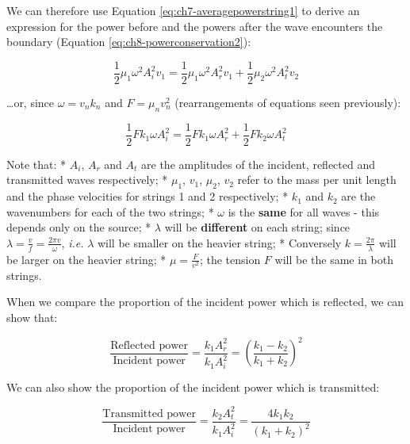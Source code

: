 \documentclass[
]{book}
\begin{document}
We can therefore use Equation \eqref{eq:ch7-averagepowerstring1} to derive an expression for the power before and the powers after the wave encounters the boundary (Equation \eqref{eq:ch8-powerconservation2}):

\begin{equation}
\frac{1}{2}\mu_1 \omega^2 A_i^2 v_1 = \frac{1}{2}\mu_1 \omega^2 A_r^2 v_1 + \frac{1}{2}\mu_2 \omega^2 A_t^2 v_2
\label{eq:ch8-powerconservation2}
\end{equation}

\ldots or, since \(\omega = v_n k_n\) and \(F = \mu_n v_n^2\) (rearrangements of equations seen previously):

\begin{equation}
\frac{1}{2} F k_1 \omega A_i^2  = \frac{1}{2}F k_1 \omega A_r^2 + \frac{1}{2}F k_2 \omega A_t^2
\label{eq:ch8-powerconservation3}
\end{equation}

Note that:
* \(A_i\), \(A_r\) and \(A_t\) are the amplitudes of the incident, reflected and transmitted waves respectively;
* \(\mu_1\), \(v_1\), \(\mu_2\), \(v_2\) refer to the mass per unit length and the phase velocities for strings 1 and 2 respectively;
* \(k_1\) and \(k_2\) are the wavenumbers for each of the two strings;
* \(\omega\) is the \textbf{same} for all waves - this depends only on the source;
* \(\lambda\) will be \textbf{different} on each string; since \(\lambda = \frac{v}{f} = \frac{2\pi v}{\omega}\), \emph{i.e.} \(\lambda\) will be smaller on the heavier string;
* Conversely \(k = \frac{2\pi}{\lambda}\) will be larger on the heavier string;
* \(\mu = \frac{F}{v^2}\); the tension \(F\) will be the same in both strings.

When we compare the proportion of the incident power which is reflected, we can show that:

\begin{equation}
\frac{\textrm{Reflected power}}{\textrm{Incident power}} = \frac{k_1 A_r^2}{k_1 A_i^2} = \left( \frac{k_1 - k_2}{k_1 + k_2} \right)^2
\label{eq:ch8-powerratio1}
\end{equation}

We can also show the proportion of the incident power which is transmitted:

\begin{equation}
\frac{\textrm{Transmitted power}}{\textrm{Incident power}} = \frac{k_2 A_t^2}{k_1 A_i^2} =  \frac{4k_1 k_2}{\left( k_1 + k_2\right)^2}
\label{eq:ch8-powerratio2}
\end{equation}
\end{document}
